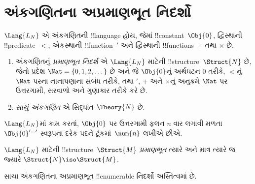 \documentclass[../../../include/open-logic-section]{subfiles}
\begin{document}
\section{અંકગણિતના અપ્રમાણભૂત નિદર્શો}

\begin{defn}
$\Lang{L_N}$ એ અંકગણિતની !!{language} હોય,
જેમાં !!{constant}~$\Obj{0}$, દ્વિસ્થાની
!!{predicate}~$<$, એકસ્થાની !!{function}~$\prime$
અને દ્વિસ્થાની !!{function}s~$+$ તથા $\times$
છે.
\begin{enumerate}
\item અંકગણિતનું \emph{પ્રમાણભૂત નિદર્શ}
  એ $\Lang{L_N}$ માટેની !!{structure}~$\Struct{N}$
  છે, જેનો પ્રદેશ
  $\Nat = \{ 0, 1, 2, \dots\}$ છે અને જે
  $\Obj{0}$નું અર્થઘટન $0$ તરીકે, $<$નું
  $\Nat$ પરના નાનાપણાના સંબંધ તરીકે,
  તથા $\prime$, $+$ અને $\times$નું
  અનુક્રમે $\Nat$ પર ઉત્તરગામી,
  સરવાળો અને ગુણાકાર તરીકે કરે છે.
\item \emph{સાચું અંકગણિત} એ
  સિદ્ધાંત $\Theory{N}$ છે.
\end{enumerate}
\end{defn}

$\Lang{L_N}$માં કામ કરતાં, $\Obj{0}$ પર
ઉત્તરગામી ફલન $n$ વાર લગાવી મળતા
$\Obj{0}^{\prime\dots\prime}$
સ્વરૂપના દરેક પદને ટૂંકમાં~$\num{n}$
લખીએ છીએ.

\begin{defn}
$\Lang{L_N}$ માટેની !!{structure}~$\Struct{M}$
\emph{પ્રમાણભૂત} ત્યારે અને માત્ર ત્યારે
જ જ્યારે $\Struct{N} \iso \Struct{M}$.
\end{defn}

\begin{thm}
સાચા અંકગણિતના અપ્રમાણભૂત
!!{enumerable} નિદર્શો અસ્તિત્વમાં છે.
\end{thm}
\end{document}
